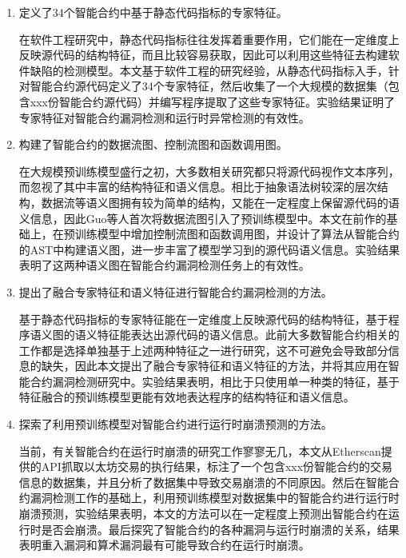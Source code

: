 \begin{enumerate}[label=(\arabic*)]
    \item 定义了34个智能合约中基于静态代码指标的专家特征。
    
    在软件工程研究中，静态代码指标往往发挥着重要作用，它们能在一定维度上反映源代码的结构特征，而且比较容易获取，因此可以利用这些特征去构建软件缺陷的检测模型。本文基于软件工程的研究经验，从静态代码指标入手，针对智能合约源代码定义了34个专家特征，然后收集了一个大规模的数据集（包含xxx份智能合约源代码）并编写程序提取了这些专家特征。实验结果证明了专家特征对智能合约漏洞检测和运行时异常检测的有效性。
    
    \item 构建了智能合约的数据流图、控制流图和函数调用图。
    
    在大规模预训练模型盛行之初，大多数相关研究都只将源代码视作文本序列，而忽视了其中丰富的结构特征和语义信息。相比于抽象语法树较深的层次结构，数据流等语义图拥有较为简单的结构，又能在一定程度上保留源代码的语义信息，因此Guo等人\cite{guo2020graphcodebert}首次将数据流图引入了预训练模型中。本文在前作的基础上，在预训练模型中增加控制流图和函数调用图，并设计了算法从智能合约的AST中构建语义图，进一步丰富了模型学习到的源代码语义信息。实验结果表明了这两种语义图在智能合约漏洞检测任务上的有效性。

    \item 提出了融合专家特征和语义特征进行智能合约漏洞检测的方法。
    
    基于静态代码指标的专家特征能在一定维度上反映源代码的结构特征，基于程序语义图的语义特征能表达出源代码的语义信息。此前大多数智能合约相关的工作都是选择单独基于上述两种特征之一进行研究，这不可避免会导致部分信息的缺失，因此本文提出了融合专家特征和语义特征的方法，并将其应用在智能合约漏洞检测研究中。实验结果表明，相比于只使用单一种类的特征，基于特征融合的预训练模型更能有效地表达程序的结构特征和语义信息。

    \item 探索了利用预训练模型对智能合约进行运行时崩溃预测的方法。

    当前，有关智能合约在运行时崩溃的研究工作寥寥无几，本文从Etherscan提供的API抓取以太坊交易的执行结果，标注了一个包含xxx份智能合约的交易信息的数据集，并且分析了数据集中导致交易崩溃的不同原因。然后在智能合约漏洞检测工作的基础上，利用预训练模型对数据集中的智能合约进行运行时崩溃预测，实验结果表明，本文的方法可以在一定程度上预测出智能合约在运行时是否会崩溃。最后探究了智能合约的各种漏洞与运行时崩溃的关系，结果表明重入漏洞和算术漏洞最有可能导致合约在运行时崩溃。

\end{enumerate}
